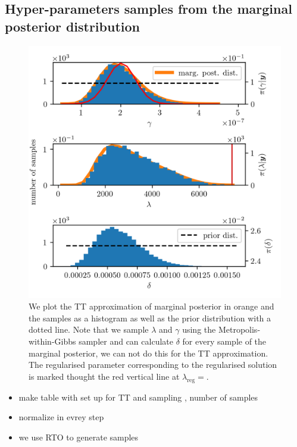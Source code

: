 \subsection{Hyper-parameters samples from the marginal posterior distribution}
\begin{figure}[ht!]
	\centering
	\includegraphics{secSIRTMargMargO3Res.png}
	\caption[Marginal posterior histograms and TT approximation as well as hyper-prior distribution.]{We plot the TT approximation of marginal posterior in orange and the samples as a histogram as well as the prior distribution with a dotted line. Note that we sample $\lambda$ and $\gamma$ using the Metropolis-within-Gibbs sampler and can calculate $\delta$ for every sample of the marginal posterior, we can not do this for the TT approximation. The regularised parameter corresponding to the regularised solution is marked thought the red vertical line at $\lambda_{\text{reg}} =$.}
	\label{fig:MargPostHistTT}
\end{figure}

\begin{itemize}
	\item make table with set up for TT and sampling , number of samples
	\item normalize in evrey step
	\item we use RTO to generate samples
\end{itemize}



